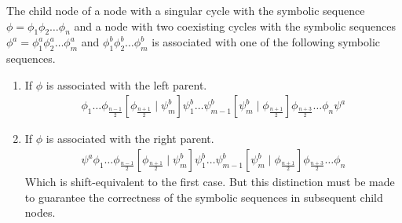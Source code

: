 \begin{theorem}
	\label{theorem:child.symbolic.2}
	The child node of a node with a singular cycle with the symbolic sequence $\phi = \phi_1\phi_2 \dots \phi_n$ and a node with two coexisting cycles with the symbolic sequences $\phi^a = \phi^a_1\phi^a_2 \dots \phi^a_m$ and $\phi^b_1\phi^b_2 \dots \phi^b_m$ is associated with one of the following symbolic sequences.
	\begin{enumerate}
		\item If $\phi$ is associated with the left parent.
		      \begin{align}
			      \phi_1 \dots \phi_{\frac{n-1}{2}} \left[\phi_{\frac{n+1}{2}} \mid \psi^b_m\right]
			      \psi^b_1 \dots \psi^b_{m-1} \left[\psi^b_m \mid \phi_{\frac{n+1}{2}}\right]
			      \phi_{\frac{n+3}{2}} \dots \phi_n \psi^a
		      \end{align}
		\item If $\phi$ is associated with the right parent.
		      \begin{align}
			      \psi^a \phi_1 \dots \phi_{\frac{n-1}{2}} \left[\phi_{\frac{n+1}{2}} \mid \psi^b_m\right]
			      \psi^b_1 \dots \psi^b_{m-1} \left[\psi^b_m \mid \phi_{\frac{n+1}{2}}\right]
			      \phi_{\frac{n+3}{2}} \dots \phi_n
		      \end{align}
		      Which is shift-equivalent to the first case.
		      But this distinction must be made to guarantee the correctness of the symbolic sequences in subsequent child nodes.
	\end{enumerate}
\end{theorem}

